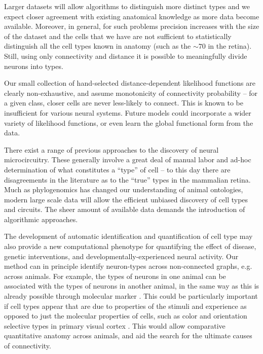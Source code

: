 \documentclass{article}
\begin{document}
Larger datasets will allow algorithms to distinguish more distinct
types and we expect closer agreement with existing anatomical
knowledge as more data become available.  Moreover, in general, for
such problems precision increases with the size of the dataset and the
cells that we have are not sufficient to statistically distinguish all
the cell types known in anatomy (such as the $\sim 70$ in the
retina). Still, using only connectivity and distance it is possible to
meaningfully divide neurons into types.

Our small collection of hand-selected distance-dependent likelihood
functions are clearly non-exhaustive, and assume monotonicity
of connectivity probability -- for a given class, closer cells
are never less-likely to connect. This is known to be insufficient
for various neural systems. Future models could incorporate
a wider variety of likelihood functions, or even learn the global
functional form from the data. 

There exist a range of previous approaches to the discovery of neural
microcircuitry\autocite{Mountcastle1957, Douglas1991, Bartho2004,
  Freund1998}.  These generally involve a great deal of manual labor
and ad-hoc determination of what constitutes a “type” of cell -- to
this day there are disagreements in the literature as to the “true”
types in the mammalian retina. Much as phylogenomics has changed our
understanding of animal ontologies, modern large scale data will allow
the efficient unbiased discovery of cell types and circuits. The sheer
amount of available data demands the introduction of algorithmic
approaches.

The development of automatic identification and quantification of cell
type may also provide a new computational phenotype for quantifying
the effect of disease, genetic interventions, and
developmentally-experienced neural activity. Our method can in
principle identify neuron-types across non-connected graphs,
e.g. across animals. For example, the types of neurons in one animal
can be associated with the types of neurons in another animal, in the
same way as this is already possible through molecular marker
\autocite{Brown2009}. This could be particularly important if cell
types appear that are due to properties of the stimuli and experience
as opposed to just the molecular properties of cells, such as color
and orientation selective types in primary visual cortex
\autocite{Sincich2005,Lennie2005}. This would allow comparative
quantitative anatomy across animals, and aid the search for the
ultimate causes of connectivity.
\end{document}
